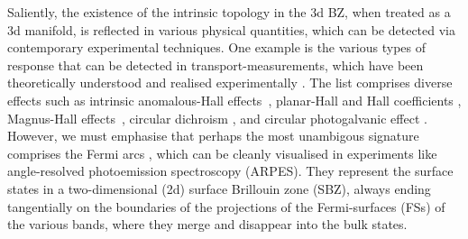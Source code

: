\documentclass[aps,prb,onecolumn, footinbib, 10pt]{revtex4-2}
\begin{document}
Saliently, the existence of the intrinsic topology in the 3d BZ, when treated as a 3d manifold, is reflected in various physical quantities, which can be detected via contemporary experimental techniques. One example is the various types of response that can be detected in transport-measurements, which have been theoretically understood and realised experimentally \cite{timm, ips_rahul_ph_strain, *rahul-jpcm, *ips-ruiz, *ips-tilted, *ips-floquet, ips-kush-review, claudia-multifold, ips-rsw-ph, *ips-shreya}. The list comprises diverse effects such as intrinsic anomalous-Hall effects~\cite{haldane04_berry, goswami13_axionic, burkov14_anomolous}, planar-Hall and Hall coefficients \cite{zhang16_linear, chen16_thermoelectric, nandy_2017_chiral, *nandy18_Berry, amit_magneto,  pal22a_berry, fu22_thermoelectric, timm, staalhammar20_magneto, *yadav23_magneto, ips_rahul_ph_strain, *rahul-jpcm, *ips-ruiz, *ips-tilted, ips-rsw-ph,ips-internode, ips-shreya, ips-spin1-ph,*ips-exact-spin1, ips-nl-ph,  claudia-multifold, ips-exact-kwn}, Magnus-Hall effects~\cite{papaj_magnus, *amit-magnus, *ips-magnus}, circular dichroism \cite{ips-cd1, *ips_cd}, and circular photogalvanic effect \cite{moore18_optical, guo23_light,kozii, *ips_cpge}. However, we must emphasise that perhaps the most unambigous signature comprises the Fermi arcs \cite{yang_Weyl, lv_Weyl_arc, sanchez, spin1-arc,shroter-arc, Yao2020, multifold-rhsi-arc, quad-weyl-arc}, which can be cleanly visualised in experiments like angle-resolved photoemission spectroscopy (ARPES). They represent the surface states in a two-dimensional (2d) surface Brillouin zone (SBZ), always ending tangentially on the boundaries of the projections of the Fermi-surfaces (FSs) of the various bands, where they merge and disappear into the bulk states.
\end{document}
